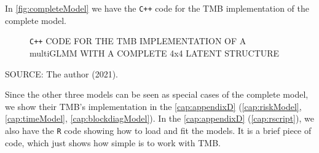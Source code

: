 In \autoref{fig:completeModel} we have the \texttt{C++} code for the TMB
implementation of the complete model.

\begin{figure}[H]
 \setlength{\abovecaptionskip}{.0001pt}
 \caption{\texttt{C++} CODE FOR THE TMB IMPLEMENTATION OF A multiGLMM
          WITH A COMPLETE 4x4 LATENT STRUCTURE}
 \vspace{-0.4cm}
 \label{fig:completeModel}
\end{figure}


\vspace{-0.5cm}
\begin{center}
 \begin{footnotesize}
  SOURCE: The author (2021).
 \end{footnotesize}
\end{center}

Since the other three models can be seen as special cases of the
complete model, we show their TMB's implementation in
the \autoref{cap:appendixD} (\autoref{cap:riskModel},
\autoref{cap:timeModel}, \autoref{cap:blockdiagModel}). In the
\autoref{cap:appendixD} (\autoref{cap:rscript}), we also have the
\texttt{R} code showing how to load and fit the models. It is a brief
piece of code, which just shows how simple is to work with TMB.

